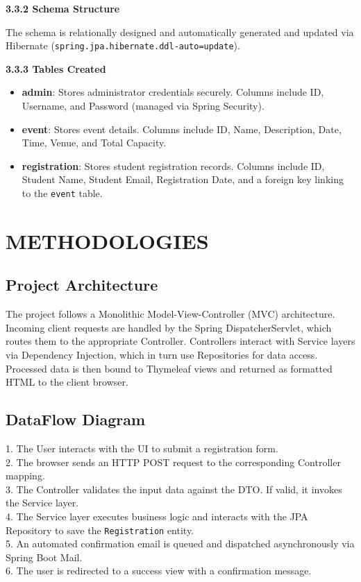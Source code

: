\documentclass[12pt]{report}
\begin{document}
\textbf{3.3.2 Schema Structure}

The schema is relationally designed and automatically generated and updated via Hibernate (\texttt{spring.jpa.hibernate.ddl-auto=update}).

\textbf{3.3.3 Tables Created}

\begin{itemize}
    \item \textbf{admin}: Stores administrator credentials securely. Columns include ID, Username, and Password (managed via Spring Security).
    \item \textbf{event}: Stores event details. Columns include ID, Name, Description, Date, Time, Venue, and Total Capacity.
    \item \textbf{registration}: Stores student registration records. Columns include ID, Student Name, Student Email, Registration Date, and a foreign key linking to the \texttt{event} table.
\end{itemize}

\chapter{ METHODOLOGIES } 
\linespread{1.5} 
\section{Project Architecture} 
  
The project follows a Monolithic Model-View-Controller (MVC) architecture. Incoming client requests are handled by the Spring DispatcherServlet, which routes them to the appropriate Controller. Controllers interact with Service layers via Dependency Injection, which in turn use Repositories for data access. Processed data is then bound to Thymeleaf views and returned as formatted HTML to the client browser.

\section{DataFlow Diagram} 
1. The User interacts with the UI to submit a registration form. \\
2. The browser sends an HTTP POST request to the corresponding Controller mapping. \\
3. The Controller validates the input data against the DTO. If valid, it invokes the Service layer. \\
4. The Service layer executes business logic and interacts with the JPA Repository to save the \texttt{Registration} entity. \\
5. An automated confirmation email is queued and dispatched asynchronously via Spring Boot Mail. \\
6. The user is redirected to a success view with a confirmation message.
\end{document}

